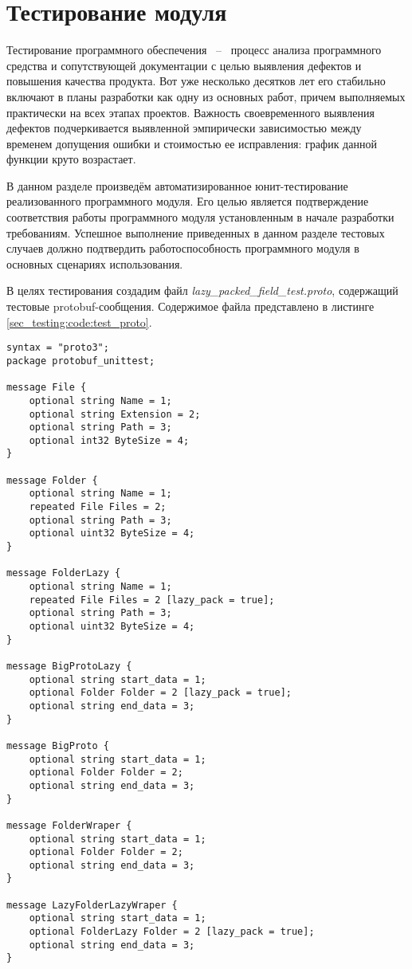 \section{Тестирование модуля}

Тестирование программного обеспечения ~--~ процесс анализа программного средства и сопутствующей документации с целью выявления
дефектов и повышения качества продукта. Вот уже несколько десятков лет его стабильно включают в планы разработки как одну из основных работ,
причем выполняемых практически на всех этапах проектов. Важность своевременного выявления дефектов подчеркивается выявленной
эмпирически зависимостью между временем допущения ошибки и стоимостью ее исправления: график данной функции круто возрастает.

В данном разделе произведём автоматизированное юнит-тестирование реализованного программного модуля. 
Его целью является подтверждение соответствия работы программного модуля установленным в начале
разработки требованиям. Успешное выполнение приведенных в данном разделе тестовых случаев должно подтвердить работоспособность
программного модуля в основных сценариях использования.

В целях тестирования создадим файл \textit{lazy\_packed\_field\_test.proto}, содержащий тестовые protobuf-сообщения.
Содержимое файла представлено в листинге \ref{sec_testing:code:test_proto}.

\begin{lstlisting}[style=CodeListing, label=sec_testing:code:test_proto, caption={Protobuf-сообщения для тестирования}]
syntax = "proto3";
package protobuf_unittest;

message File {
    optional string Name = 1;
    optional string Extension = 2;
    optional string Path = 3;
    optional int32 ByteSize = 4;
}

message Folder {
    optional string Name = 1;
    repeated File Files = 2;
    optional string Path = 3;
    optional uint32 ByteSize = 4;
}

message FolderLazy {
    optional string Name = 1;
    repeated File Files = 2 [lazy_pack = true];
    optional string Path = 3;
    optional uint32 ByteSize = 4;
}

message BigProtoLazy {
    optional string start_data = 1;
    optional Folder Folder = 2 [lazy_pack = true];
    optional string end_data = 3;
}

message BigProto {
    optional string start_data = 1;
    optional Folder Folder = 2;
    optional string end_data = 3;
}

message FolderWraper {
    optional string start_data = 1;
    optional Folder Folder = 2;
    optional string end_data = 3;
}

message LazyFolderLazyWraper {
    optional string start_data = 1;
    optional FolderLazy Folder = 2 [lazy_pack = true];
    optional string end_data = 3;
}
\end{lstlisting}

